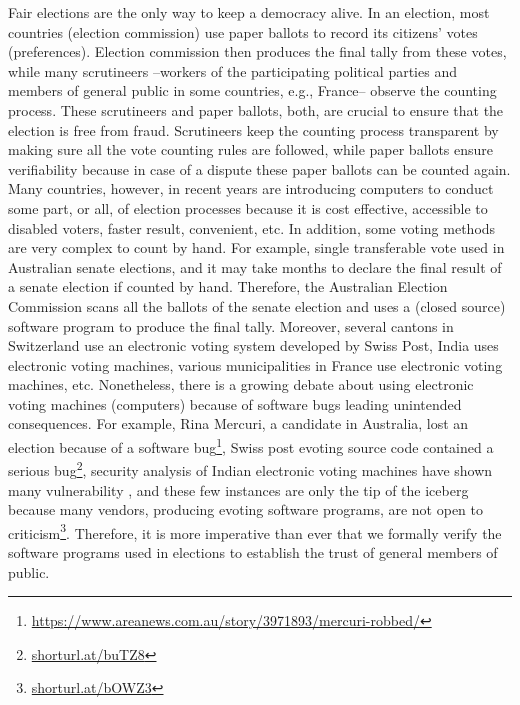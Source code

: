 \documentclass[a4paper]{article}
\begin{document}
Fair elections are the only way to keep a democracy alive. In an election, most countries (election commission) use paper ballots to record 
its citizens' votes (preferences). Election commission then produces the final tally from these votes, 
while many scrutineers --workers of the participating political parties and members of general 
public in some countries, e.g., France-- observe the counting process. 
These scrutineers and paper ballots, both, are crucial to ensure that 
the election is free from fraud. Scrutineers keep the counting process transparent by making sure all the vote counting 
rules are followed, while paper ballots ensure verifiability because in case of a dispute these paper ballots 
can be counted again. Many countries, however, in recent years are introducing computers to conduct some part, or all, of 
election processes because it is cost effective, accessible to disabled voters, faster result, convenient, etc. 
In addition, some voting methods are very complex to count by hand. For example,
single transferable vote used in Australian senate elections, and it may take months to declare the final result of 
a senate election if 
counted by hand. Therefore, the Australian Election Commission scans all the ballots of the senate election and 
uses a (closed source) software program to produce the final tally. Moreover, several cantons in Switzerland use an electronic 
voting system developed by Swiss Post, India uses electronic voting machines, various municipalities in France 
use electronic voting machines, etc.  Nonetheless, there is a growing debate about using electronic voting machines (computers)
because of software bugs leading unintended consequences. For example, Rina Mercuri, 
a candidate in Australia, lost an election because of 
a software bug\footnote{\url{https://www.areanews.com.au/story/3971893/mercuri-robbed/}}, 
Swiss post evoting source code contained a serious 
bug\footnote{\url{shorturl.at/buTZ8}}, security analysis of Indian electronic 
voting machines have shown many vulnerability \cite{Wolchok:2010:SAI:1866307.1866309}, and 
these few instances are only the tip of the iceberg because many vendors, producing 
evoting software programs, are not open to criticism\footnote{\url{shorturl.at/bOWZ3}}.
Therefore, it is more imperative than ever  that  we formally verify the software programs 
used in elections to establish the trust of general members of public. 
\end{document}
